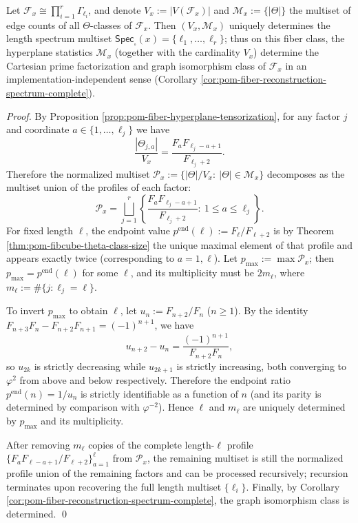 \begin{corollary}\label{cor:pom-fiber-hyperplane-spectrum-invertibility}
Let \(\mathcal F_x\cong\prod_{i=1}^r\Gamma_{\ell_i}\), and denote \(V_x:=|V(\mathcal F_x)|\) and \(\mathcal M_x:=\{|\Theta|\}\) the multiset of edge counts of all \(\Theta\)-classes of \(\mathcal F_x\).
Then \((V_x,\mathcal M_x)\) uniquely determines the length spectrum multiset
\(
\mathsf{Spec}_{\square}(x)=\{\ell_1,\dots,\ell_r\}
\);
thus on this fiber class, the hyperplane statistics \(\mathcal M_x\) (together with the cardinality \(V_x\)) determine the Cartesian prime factorization and graph isomorphism class of \(\mathcal F_x\) in an implementation-independent sense (Corollary \ref{cor:pom-fiber-reconstruction-spectrum-complete}).
\end{corollary}
\begin{proof}
By Proposition \ref{prop:pom-fiber-hyperplane-tensorization}, for any factor \(j\) and coordinate \(a\in\{1,\dots,\ell_j\}\) we have
\[
\frac{|\Theta_{j,a}|}{V_x}=\frac{F_aF_{\ell_j-a+1}}{F_{\ell_j+2}}.
\]
Therefore the normalized multiset
\(
\mathcal P_x:=\{|\Theta|/V_x:\ |\Theta|\in\mathcal M_x\}
\)
decomposes as the multiset union of the profiles of each factor:
\[
\mathcal P_x=\bigsqcup_{j=1}^r \left\{\frac{F_aF_{\ell_j-a+1}}{F_{\ell_j+2}}:\ 1\le a\le \ell_j\right\}.
\]
For fixed length \(\ell\), the endpoint value
\(
p^{\mathrm{end}}(\ell):=F_{\ell}/F_{\ell+2}
\)
is by Theorem \ref{thm:pom-fibcube-theta-class-size} the unique maximal element of that profile and appears exactly twice (corresponding to \(a=1,\ell\)).
Let \(p_{\max}:=\max\mathcal P_x\); then \(p_{\max}=p^{\mathrm{end}}(\ell)\) for some \(\ell\), and its multiplicity must be \(2m_\ell\), where \(m_\ell:=\#\{j:\ell_j=\ell\}\).
\par
To invert \(p_{\max}\) to obtain \(\ell\), let \(u_n:=F_{n+2}/F_n\) (\(n\ge 1\)).
By the identity
\(
F_{n+3}F_n-F_{n+2}F_{n+1}=(-1)^{n+1}
\),
we have
\[
u_{n+2}-u_n=\frac{(-1)^{n+1}}{F_{n+2}F_n},
\]
so \(u_{2k}\) is strictly decreasing while \(u_{2k+1}\) is strictly increasing, both converging to \(\varphi^2\) from above and below respectively.
Therefore the endpoint ratio \(p^{\mathrm{end}}(n)=1/u_n\) is strictly identifiable as a function of \(n\) (and its parity is determined by comparison with \(\varphi^{-2}\)).
Hence \(\ell\) and \(m_\ell\) are uniquely determined by \(p_{\max}\) and its multiplicity.
\par
After removing \(m_\ell\) copies of the complete length-\(\ell\) profile
\(
\{F_aF_{\ell-a+1}/F_{\ell+2}\}_{a=1}^{\ell}
\)
from \(\mathcal P_x\), the remaining multiset is still the normalized profile union of the remaining factors and can be processed recursively; recursion terminates upon recovering the full length multiset \(\{\ell_i\}\).
Finally, by Corollary \ref{cor:pom-fiber-reconstruction-spectrum-complete}, the graph isomorphism class is determined. \qed
\end{proof}


